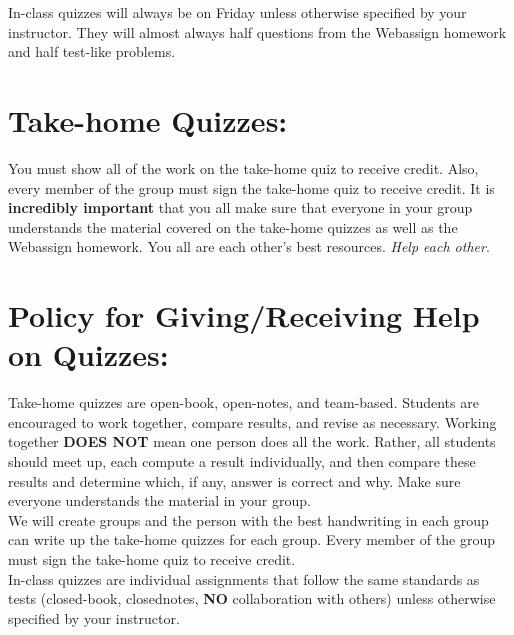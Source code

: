 \documentclass[paper=a4, fontsize=11pt]{scrartcl} %
\numberwithin{equation}{section} %
\numberwithin{figure}{section} %
\numberwithin{table}{section} %
\begin{document}
In-class quizzes will always be on Friday unless otherwise specified by your instructor. They will almost always half questions from the Webassign homework and half test-like problems.


\section*{\textbf{Take-home Quizzes:}}

You must show all of the work on the take-home quiz to receive credit. Also, every member of the group must sign the take-home quiz to receive credit. It is \textbf{incredibly important} that you all make sure that everyone in your group understands the material covered on the take-home quizzes as well as the Webassign homework. You all are each other's best resources. \textit{Help each other}.


\section*{\textbf{Policy for Giving/Receiving Help on Quizzes:}}

Take-home quizzes are open-book, open-notes, and team-based. Students are encouraged to work together, compare results, and revise as necessary. Working together \textbf{DOES NOT} mean one person does all the work. Rather, all students should meet up, each compute a result individually, and then compare these results and determine which, if any, answer is correct and why.  Make sure everyone understands the material in your group.\\

We will create groups and the person with the best handwriting in each group can write up the take-home quizzes for each group. Every member of the group must sign the take-home quiz to receive credit.\\

In-class quizzes are individual assignments that follow the same standards as tests (closed-book, closednotes, \textbf{NO} collaboration with others) unless otherwise specified by your instructor.
\end{document}
